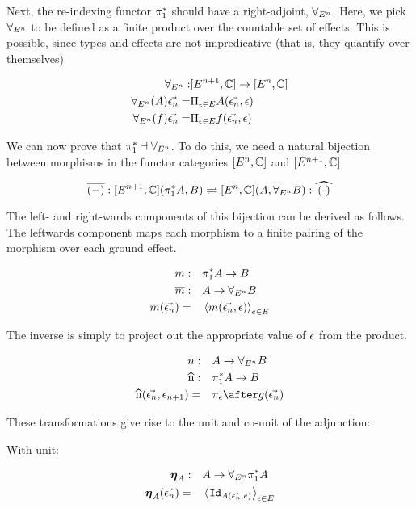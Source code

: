 \documentclass{Report}
\begin{document}
Next, the re-indexing functor $\pi_1^*$ should have a right-adjoint, $\forall_{E^n}$. Here, we pick $\forall_{E^n}$ to be defined as a finite product over the countable set of effects. This is possible, since types and effects are not impredicative (that is, they quantify over themselves)

\begin{align}
    \forall_{E^n}:& [E^{n+1}, \mathbb{C}] \rightarrow [E^n, \mathbb{C}]\\
    \forall_{E^n}(A)\vec{\epsilon_n} =&\Pi_{\epsilon\in E}{A(\vec{\epsilon_n}, \epsilon)}
    \\ 
    \forall_{E^n}(f)\vec{\epsilon_n} =&\Pi_{\epsilon\in E}{f(\vec{\epsilon_n}, \epsilon)}
\end{align}



We can now prove that $\pi_1^* \dashv \forall_{E^n}$. To do this, we need a natural bijection between morphisms in the functor categories $[E^n, \mathbb{C}]$ and $[E^{n+1}, \mathbb{C}]$.

\begin{equation}
    \bar{(-)}: [E^{n+1}, \C](\pstar A, B) \rightleftharpoons [E^n,\C] (A, \allEn B): \widehat{(-)}
\end{equation}

The left- and right-wards components of this bijection can be derived as follows. The leftwards component maps each morphism to a finite pairing of the morphism over each ground effect.

\begin{align}
    m:&\quad \pi_1^* A \rightarrow B\\
    \overline{m}:&\quad A\rightarrow \forall_{E^n} B\\
    \overline{m}(\vec{\epsilon_n}) =&\quad \left\langle m(\vec{\epsilon_n}, \epsilon)\right\rangle_{e\in E}
\end{align}

The inverse is simply to project out the appropriate value of $\epsilon$ from the product.

\begin{align}
    n:&\quad A \rightarrow \allEn B\\
    \widehat{n}:&\quad \pstar A\rightarrow B\\
    \widehat{n}(\env, \e_{n+1}) =&\quad\pi_\e\after g(\env)
\end{align}

These transformations give rise to the unit and co-unit of the adjunction:

With unit:

\begin{align}
    \boldsymbol{\eta}_{A}:&\quad A \rightarrow \forall_{E^n}\pi_1^* A\\
    \boldsymbol{\eta}_{A}(\vec{\epsilon_n})=&\quad\left\langle\texttt{Id}_{A(\vec{\epsilon_n},e)}\right\rangle_{\epsilon\in E}
\end{align}
\end{document}
